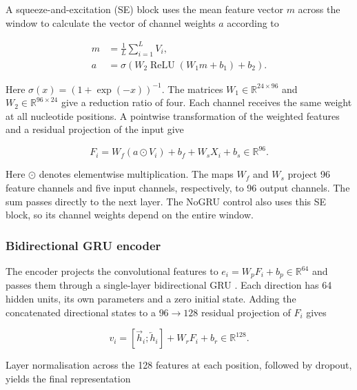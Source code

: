 \documentclass[webpdf,contemporary,large]{current_assets/oup-authoring-template}
\begin{document}
A squeeze-and-excitation (SE) block \citep{hu2018senet} uses the mean feature vector $m$ across the window to calculate the vector of channel weights $a$ according to

\begin{equation}
\begin{aligned}
m&=\frac1L\sum_{i=1}^{L}V_i,\\
a&=\sigma\!\left(W_2\operatorname{ReLU}(W_1m+b_1)+b_2\right).
\end{aligned}
\label{eq:se_gate}
\end{equation}

Here $\sigma(x)=(1+\exp(-x))^{-1}$. The matrices $W_1\in\mathbb R^{24\times96}$ and $W_2\in\mathbb R^{96\times24}$ give a reduction ratio of four. Each channel receives the same weight at all nucleotide positions. A pointwise transformation of the weighted features and a residual projection of the input \citep{he2016resnet} give

\begin{equation}
F_i=W_f(a\odot V_i)+b_f+W_sX_i+b_s
\in\mathbb R^{96}.
\label{eq:motif_residual}
\end{equation}

Here $\odot$ denotes elementwise multiplication. The maps $W_f$ and $W_s$ project 96 feature channels and five input channels, respectively, to 96 output channels. The sum passes directly to the next layer. The NoGRU control also uses this SE block, so its channel weights depend on the entire window.

\subsubsection{Bidirectional GRU encoder}

The encoder projects the convolutional features to $e_i=W_pF_i+b_p\in\mathbb R^{64}$ and passes them through a single-layer bidirectional GRU \citep{cho2014rnnencoder,schuster1997brnn}. Each direction has 64 hidden units, its own parameters and a zero initial state. Adding the concatenated directional states to a $96\rightarrow128$ residual projection of $F_i$ gives

\begin{equation}
v_i=[\overrightarrow h_i;\overleftarrow h_i]+W_rF_i+b_r
\in\mathbb R^{128}.
\label{eq:bidirectional_sum}
\end{equation}

Layer normalisation across the 128 features at each position, followed by dropout, yields the final representation
\end{document}
